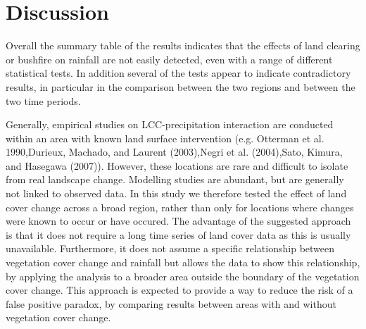 \documentclass[]{elsarticle} %
\theoremstyle{definition}
\theoremstyle{definition}
\theoremstyle{definition}
\theoremstyle{remark}
\begin{document}
\section{Discussion}\label{discussion}

\begin{table}

\caption{\label{tab:summarytable}Summary table of all tests on the two regions and for the two time periods}
\centering
{}
\end{table}

Overall the summary table of the results indicates that the effects of
land clearing or bushfire on rainfall are not easily detected, even with
a range of different statistical tests. In addition several of the tests
appear to indicate contradictory results, in particular in the
comparison between the two regions and between the two time periods.

Generally, empirical studies on LCC-precipitation interaction are
conducted within an area with known land surface intervention (e.g.
Otterman et al. 1990,Durieux, Machado, and Laurent (2003),Negri et al.
(2004),Sato, Kimura, and Hasegawa (2007)). However, these locations are
rare and difficult to isolate from real landscape change. Modelling
studies are abundant, but are generally not linked to observed data. In
this study we therefore tested the effect of land cover change across a
broad region, rather than only for locations where changes were known to
occur or have occured. The advantage of the suggested approach is that
it does not require a long time series of land cover data as this is
usually unavailable. Furthermore, it does not assume a specific
relationship between vegetation cover change and rainfall but allows the
data to show this relationship, by applying the analysis to a broader
area outside the boundary of the vegetation cover change. This approach
is expected to provide a way to reduce the risk of a false positive
paradox, by comparing results between areas with and without vegetation
cover change.
\end{document}
